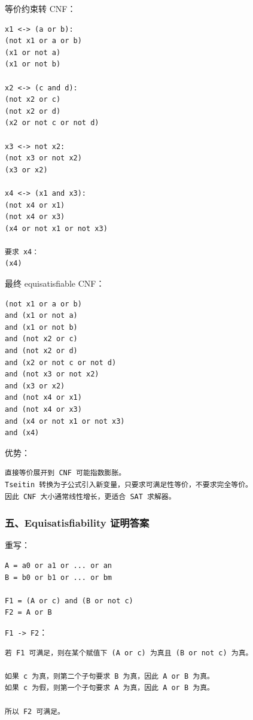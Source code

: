 \documentclass[UTF8]{ctexart}
\begin{document}
等价约束转 CNF：

\begin{Verbatim}[fontsize=\small,breaklines=true]
x1 <-> (a or b):
(not x1 or a or b)
(x1 or not a)
(x1 or not b)

x2 <-> (c and d):
(not x2 or c)
(not x2 or d)
(x2 or not c or not d)

x3 <-> not x2:
(not x3 or not x2)
(x3 or x2)

x4 <-> (x1 and x3):
(not x4 or x1)
(not x4 or x3)
(x4 or not x1 or not x3)

要求 x4：
(x4)
\end{Verbatim}

最终 equisatisfiable CNF：

\begin{Verbatim}[fontsize=\small,breaklines=true]
(not x1 or a or b)
and (x1 or not a)
and (x1 or not b)
and (not x2 or c)
and (not x2 or d)
and (x2 or not c or not d)
and (not x3 or not x2)
and (x3 or x2)
and (not x4 or x1)
and (not x4 or x3)
and (x4 or not x1 or not x3)
and (x4)
\end{Verbatim}

优势：

\begin{Verbatim}[fontsize=\small,breaklines=true]
直接等价展开到 CNF 可能指数膨胀。
Tseitin 转换为子公式引入新变量，只要求可满足性等价，不要求完全等价。
因此 CNF 大小通常线性增长，更适合 SAT 求解器。
\end{Verbatim}

\subsubsection*{五、Equisatisfiability 证明答案}

重写：

\begin{Verbatim}[fontsize=\small,breaklines=true]
A = a0 or a1 or ... or an
B = b0 or b1 or ... or bm

F1 = (A or c) and (B or not c)
F2 = A or B
\end{Verbatim}

\texttt{F1 -> F2}：

\begin{Verbatim}[fontsize=\small,breaklines=true]
若 F1 可满足，则在某个赋值下 (A or c) 为真且 (B or not c) 为真。

如果 c 为真，则第二个子句要求 B 为真，因此 A or B 为真。
如果 c 为假，则第一个子句要求 A 为真，因此 A or B 为真。

所以 F2 可满足。
\end{Verbatim}
\end{document}
